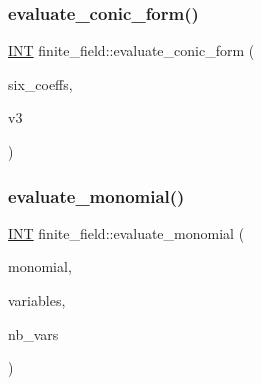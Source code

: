 \subsubsection{\texorpdfstring{evaluate\+\_\+conic\+\_\+form()}{evaluate\_conic\_form()}}
{\footnotesize\ttfamily \mbox{\hyperlink{galois_8h_a09fddde158a3a20bd2dcadb609de11dc}{I\+NT}} finite\+\_\+field\+::evaluate\+\_\+conic\+\_\+form (\begin{DoxyParamCaption}\item[{\mbox{\hyperlink{galois_8h_a09fddde158a3a20bd2dcadb609de11dc}{I\+NT}} $\ast$}]{six\+\_\+coeffs,  }\item[{\mbox{\hyperlink{galois_8h_a09fddde158a3a20bd2dcadb609de11dc}{I\+NT}} $\ast$}]{v3 }\end{DoxyParamCaption})}

\mbox{\label{classfinite__field_a13f9d419956a9168a65788b32839c7f2}} 
\subsubsection{\texorpdfstring{evaluate\+\_\+monomial()}{evaluate\_monomial()}}
{\footnotesize\ttfamily \mbox{\hyperlink{galois_8h_a09fddde158a3a20bd2dcadb609de11dc}{I\+NT}} finite\+\_\+field\+::evaluate\+\_\+monomial (\begin{DoxyParamCaption}\item[{\mbox{\hyperlink{galois_8h_a09fddde158a3a20bd2dcadb609de11dc}{I\+NT}} $\ast$}]{monomial,  }\item[{\mbox{\hyperlink{galois_8h_a09fddde158a3a20bd2dcadb609de11dc}{I\+NT}} $\ast$}]{variables,  }\item[{\mbox{\hyperlink{galois_8h_a09fddde158a3a20bd2dcadb609de11dc}{I\+NT}}}]{nb\+\_\+vars }\end{DoxyParamCaption})}

\mbox{\label{classfinite__field_a5a8c495dd36789d2cb4619d678afd107}} 
